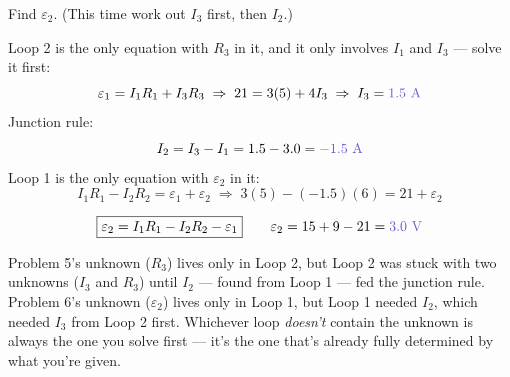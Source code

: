 \documentclass[12pt]{article}
\newcommand{\ANS}[1]{\textcolor{accent}{#1}}
\begin{document}
Find $\varepsilon_2$. (This time work out $I_3$ first, then $I_2$.)

{\small
Loop 2 is the only equation with $R_3$ in it, and it only involves $I_1$
and $I_3$ --- solve it first:
\[
\varepsilon_1=I_1R_1+I_3R_3 \;\Rightarrow\; 21=3(5)+4I_3 \;\Rightarrow\;
I_3=\ANS{1.5\text{ A}}
\]
Junction rule:
\[
I_2=I_3-I_1=1.5-3.0=\ANS{-1.5\text{ A}}
\]
Loop 1 is the only equation with $\varepsilon_2$ in it:
\[
I_1R_1-I_2R_2=\varepsilon_1+\varepsilon_2 \;\Rightarrow\;
3(5)-(-1.5)(6)=21+\varepsilon_2
\]}

\[
\boxed{\varepsilon_2 = I_1R_1-I_2R_2-\varepsilon_1} \qquad
\varepsilon_2 = 15+9-21=\ANS{3.0\text{ V}}
\]


{\small\color{accent} Problem 5's unknown ($R_3$) lives only in Loop 2, but
Loop 2 was stuck with two unknowns ($I_3$ and $R_3$) until $I_2$ --- found
from Loop 1 --- fed the junction rule. Problem 6's unknown ($\varepsilon_2$)
lives only in Loop 1, but Loop 1 needed $I_2$, which needed $I_3$ from Loop
2 first. Whichever loop \emph{doesn't} contain the unknown is always the
one you solve first --- it's the one that's already fully determined by
what you're given.}
\end{document}
